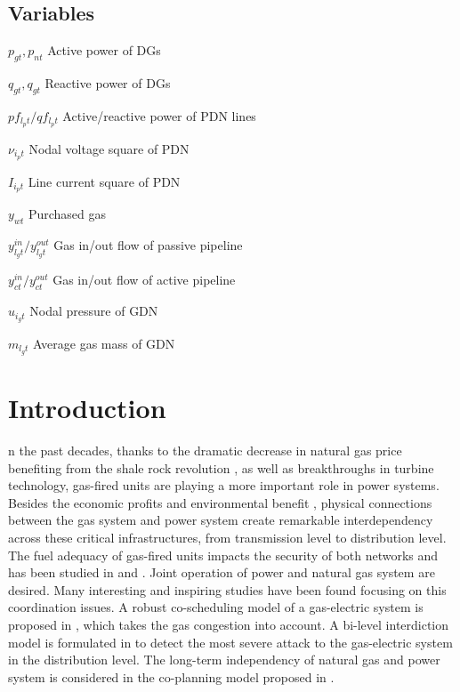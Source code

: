 \documentclass[journal]{IEEEtran}
\begin{document}
\subsection{Variables}
\begin{IEEEdescription}
\item [$p_{gt},p_{nt}$]  Active power of DGs
\item [$q_{gt},q_{gt}$]  Reactive power of DGs
\item [$pf_{l_pt}/qf_{l_pt}$] Active/reactive power of PDN lines
\item [$\nu_{i_pt}$] Nodal voltage square of PDN
\item [$I_{i_pt}$] Line current square of PDN
\item [$y_{wt}$]  Purchased gas
\item [$y_{l_gt}^{in}/y_{l_gt}^{out}$]  Gas in/out flow of passive pipeline
\item [$y_{ct}^{in}/y_{ct}^{out}$]  Gas in/out flow of active pipeline
\item [$u_{i_gt}$]  Nodal pressure of GDN
\item [$m_{l_gt}$]  Average gas mass of GDN
\end{IEEEdescription}

\section{Introduction}

n the past decades, thanks to the dramatic decrease in natural gas price benefiting from the shale rock revolution \cite{ShaleGas}, as well as breakthroughs in turbine technology, gas-fired units are playing a more important role in power systems. Besides the economic profits and environmental benefit \cite{Mohammad_Gas}, physical connections between the gas system and power system create remarkable interdependency across these critical infrastructures, from transmission level to distribution level. The fuel adequacy of gas-fired units impacts the security of both networks and has been studied in \cite{Mark_Fuel} and \cite{Chertkov_Fuel}. Joint operation of power and natural gas system are desired. Many interesting and inspiring studies have been found focusing on this coordination issues. A robust co-scheduling model of a gas-electric system is proposed in \cite{Cong_Look_ahead_congestion}, which takes the gas congestion into account. A bi-level interdiction model is formulated in \cite{Khodayar_gas_AD} to detect the most severe attack to the gas-electric system in the distribution level. The long-term independency of natural gas and power system is considered in the co-planning model proposed in \cite{Xiaping_Planning}.
\end{document}
